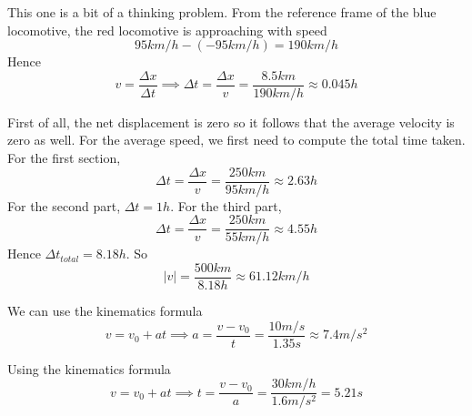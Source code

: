 \documentclass[11pt]{scrartcl}
\begin{document}
\begin{example}
  [Problem 11]
\end{example}
\begin{soln}
  This one is a bit of a thinking problem. From the reference frame
  of the blue locomotive, the red locomotive is approaching with speed
  $$95km/h-(-95km/h)=190km/h$$
  Hence
  $$v=\frac{\Delta x}{\Delta t}\implies \Delta t=\frac{\Delta x}{v}=\frac{8.5 km}{190 km/h}\approx 0.045 h$$
\end{soln}
\begin{example}
  [Problem 14]
\end{example}
\begin{soln}
  First of all, the net displacement is zero so it follows that the
  average velocity is zero as well. For the average speed, we first need to compute
  the total time taken. For the first section,
  $$\Delta t=\frac{\Delta x}{v}=\frac{250 km}{95 km/h}\approx 2.63 h$$
  For the second part, $\Delta t=1h$. For the third part,
  $$\Delta t=\frac{\Delta x}{v}=\frac{250 km}{55 km/h}\approx 4.55h$$
  Hence $\Delta t_{total}=8.18h$. So
  $$|v|=\frac{500km}{8.18h}\approx 61.12 km/h$$
\end{soln}
\begin{example}
  [Problem 17a]
\end{example}
\begin{soln}
  We can use the kinematics formula
  $$v=v_0+at\implies a=\frac{v-v_0}{t}=\frac{10 m/s}{1.35s}\approx 7.4 m/s^2$$
\end{soln}
\begin{example}
  [Problem 18]
\end{example}
\begin{soln}
  Using the kinematics formula
  $$v=v_0+at\implies t=\frac{v-v_0}{a}=\frac{30 km/h}{1.6 m/s^2}=5.21s$$
\end{soln}
\end{document}
